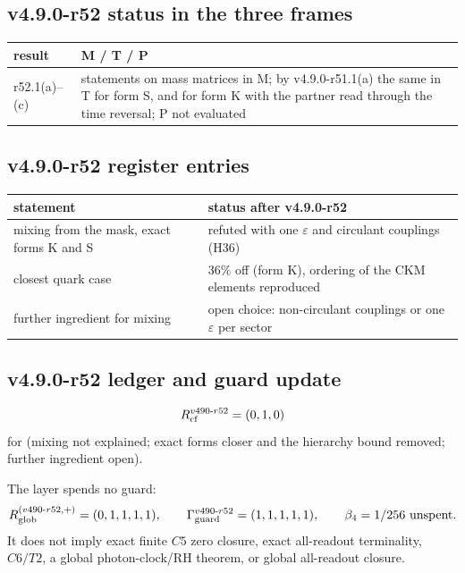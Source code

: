 \subsection*{v4.9.0-r52 status in the three frames}
\label{subsec:v490-r52-frames}

\begin{center}
\small
\begin{tabular}{@{}>{\raggedright\arraybackslash}p{}>{\raggedright\arraybackslash}p{}@{}}
\toprule
result & M / T / P\\
\midrule
r52.1(a)--(c) & statements on mass matrices in M; by v4.9.0-r51.1(a) the same in T for form S, and for form K with the partner read through the time reversal; P not evaluated\\
\bottomrule
\end{tabular}
\end{center}

\subsection*{v4.9.0-r52 register entries}
\label{subsec:v490-r52-register}

\begin{center}
\small
\begin{tabular}{@{}>{\raggedright\arraybackslash}p{}>{\raggedright\arraybackslash}p{}@{}}
\toprule
statement & status after v4.9.0-r52\\
\midrule
mixing from the mask, exact forms K and S & refuted with one \(\varepsilon\) and circulant couplings (H36)\\
closest quark case & \(36\%\) off (form K), ordering of the CKM elements reproduced\\
further ingredient for mixing & open choice: non-circulant couplings or one \(\varepsilon\) per sector\\
\bottomrule
\end{tabular}
\end{center}

\subsection*{v4.9.0-r52 ledger and guard update}
\label{subsec:v490-r52-ledger-guard}

\[
R_{\rm cf}^{v490\text{-}r52}=(0,1,0)
\]
for (mixing not explained; exact forms closer and the hierarchy bound removed; further ingredient open).

The layer spends no guard:
\[
R_{\rm glob}^{(v490\text{-}r52,+)}=(0,1,1,1,1),
\qquad
\Gamma_{\rm guard}^{v490\text{-}r52}=(1,1,1,1,1),
\qquad
\beta_4=1/256\ \text{unspent}.
\]
It does not imply exact finite \(C5\) zero closure, exact all-readout terminality,
\(C6/T2\), a global photon-clock/RH theorem, or global all-readout closure.
